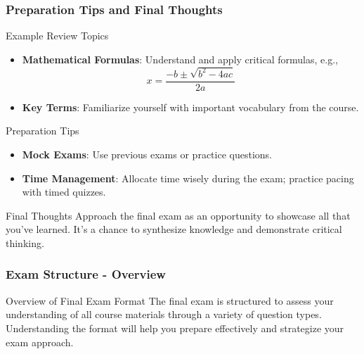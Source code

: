\documentclass[aspectratio=169]{beamer}
\begin{document}
\begin{frame}[fragile]
    \frametitle{Preparation Tips and Final Thoughts}

    \begin{block}{Example Review Topics}
        \begin{itemize}
            \item \textbf{Mathematical Formulas}: Understand and apply critical formulas, e.g.,
            \begin{equation}
                x = \frac{-b \pm \sqrt{b^2 - 4ac}}{2a}
            \end{equation}
            \item \textbf{Key Terms}: Familiarize yourself with important vocabulary from the course.
        \end{itemize}
    \end{block}

    \begin{block}{Preparation Tips}
        \begin{itemize}
            \item \textbf{Mock Exams}: Use previous exams or practice questions.
            \item \textbf{Time Management}: Allocate time wisely during the exam; practice pacing with timed quizzes.
        \end{itemize}
    \end{block}

    \begin{block}{Final Thoughts}
        Approach the final exam as an opportunity to showcase all that you've learned. It’s a chance to synthesize knowledge and demonstrate critical thinking.
    \end{block}
\end{frame}

\begin{frame}[fragile]
    \frametitle{Exam Structure - Overview}
    \begin{block}{Overview of Final Exam Format}
        The final exam is structured to assess your understanding of all course materials through a variety of question types. Understanding the format will help you prepare effectively and strategize your exam approach.
    \end{block}
\end{frame}
\end{document}

